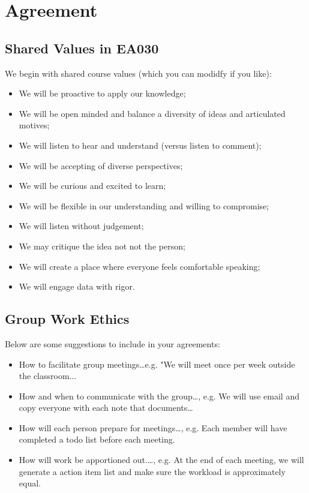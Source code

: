 \documentclass{article}\usepackage[]{graphicx}\usepackage[]{color}
\begin{document}
\section{Agreement}

\subsection{Shared Values in EA030}

We begin with shared course values (which you can modidfy if you like): 

\begin{itemize}
  \item We will be proactive to apply our knowledge;
  \item We will be open minded and balance a diversity of ideas and articulated motives;
  \item We will listen to hear and understand (versus listen to comment); 
  \item We will be accepting of diverse perspectives;
  \item We will be curious and excited to learn;
  \item We will be flexible in our understanding and willing to compromise;
  \item We will listen without judgement;
  \item We may critique the idea not not the person; 
  \item We will create a place where everyone feels comfortable speaking;
  \item We will engage data with rigor. 
\end{itemize}

\subsection{Group Work Ethics}

Below are some suggestions to include in your agreements:

\begin{itemize}
  \item How to facilitate group meetings\ldots e.g. "We will meet once per week outside the classroom... 
  \item How and when to communicate with the group\ldots, e.g. We will use email and copy everyone with each note that documents\ldots
  \item How will each person prepare for meetings\ldots, e.g. Each member will have completed a todo list before each meeting.
  \item How will work be apportioned out.\ldots, e.g. At the end of each meeting, we will generate a action item list and make sure the workload is approximately equal. 
\end{itemize}
\end{document}
